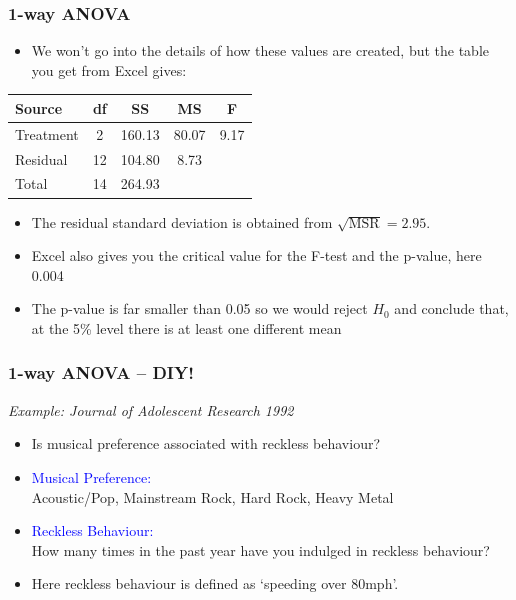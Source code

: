 \documentclass[12pt,xcolor=dvipsnames,handout,mathserif,aspectratio=169]{beamer}
\newcommand{\tc}{\textcolor}
\begin{document}
\begin{frame}\frametitle{1-way ANOVA}
\begin{itemize}
\item We won't go into the details of how these values are created, but the table you get from Excel gives:
\end{itemize}
\begin{center}
{\small{
\begin{tabular}{lcccc}\hline
Source &df& SS& MS& F\\ \hline
Treatment & 2 &160.13& 80.07& 9.17\\
Residual &12& 104.80& 8.73&\\ \hline
Total &14 &264.93&&\\\hline
\end{tabular}}}
\end{center}
\vspace*{0.3cm}
\begin{itemize}
\item The residual standard deviation is obtained from $\sqrt{\mbox{MSR}} = 2.95$.
\item Excel also gives you the critical value for the F-test and the p-value, here 0.004
\item The p-value is far smaller than 0.05 so we would reject $H_0$ and conclude that, at the 5\% level there is at least one different mean
\end{itemize}
\end{frame}


\begin{frame}\frametitle{1-way ANOVA -- DIY!}
\emph{Example: Journal of Adolescent Research 1992} 
\vspace{0.3cm}
\begin{itemize}
\item Is musical preference associated with reckless behaviour?
\vspace{0.3cm}
\item \tc{blue}{Musical Preference:}\\
Acoustic/Pop, Mainstream Rock, Hard Rock, Heavy Metal
\vspace{0.3cm}
\item \tc{blue}{Reckless Behaviour:}\\
How many times in the past year have you indulged in reckless behaviour?
\vspace{0.3cm}
\item Here reckless behaviour is defined as `speeding over 80mph'.
\end{itemize}
\end{frame}
\end{document}
